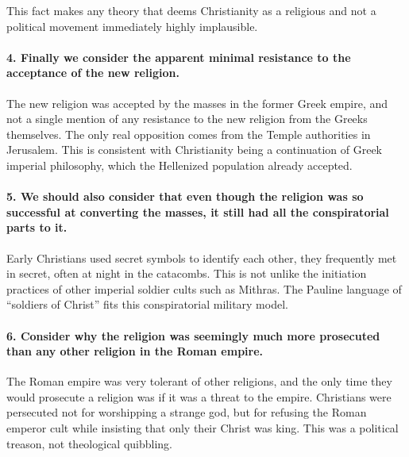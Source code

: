 This fact makes any theory that deems Christianity as a religious and not a political movement immediately highly implausible.

\paragraph{4.
Finally we consider the apparent minimal resistance to the acceptance of the new religion.}\label{par:finally-we-consider-the-apparent-minimal-resistance-to-the-acceptance-of-the-new-religion.}

The new religion was accepted by the masses in the former Greek empire, and not a single mention of any resistance to the new religion from the Greeks themselves.
The only real opposition comes from the Temple authorities in Jerusalem.
This is consistent with Christianity being a continuation of Greek imperial philosophy, which the Hellenized population already accepted.

\paragraph{5.
We should also consider that even though the religion was so successful at converting the masses, it still had all the conspiratorial parts to it.}\label{par:we-should-also-consider-that-even-though-the-religion-was-so-successful-at-converting-the-masses-it-still-had-all-the-conspiratorial-parts-to-it.}

Early Christians used secret symbols to identify each other, they frequently met in secret, often at night in the catacombs.
This is not unlike the initiation practices of other imperial soldier cults such as Mithras.
The Pauline language of ``soldiers of Christ'' fits this conspiratorial military model.

\paragraph{6.
Consider why the religion was seemingly much more prosecuted than any other religion in the Roman empire.}\label{par:consider-why-the-religion-was-seemingly-much-more-prosecuted-than-any-other-religion-in-the-roman-empire.}

The Roman empire was very tolerant of other religions, and the only time they would prosecute a religion was if it was a threat to the empire.
Christians were persecuted not for worshipping a strange god, but for refusing the Roman emperor cult while insisting that only their Christ was king.
This was a political treason, not theological quibbling.

